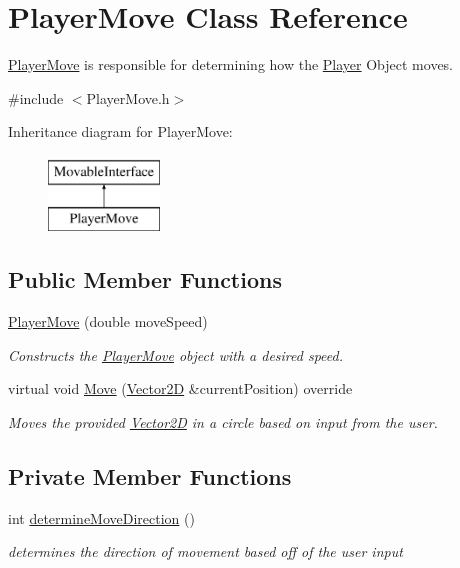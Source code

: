 \hypertarget{class_player_move}{}\section{Player\+Move Class Reference}
\label{class_player_move}


\hyperlink{class_player_move}{Player\+Move} is responsible for determining how the \hyperlink{class_player}{Player} Object moves.  




{\ttfamily \#include $<$Player\+Move.\+h$>$}

Inheritance diagram for Player\+Move\+:\begin{figure}[H]
\begin{center}
\leavevmode
\includegraphics[height=2.000000cm]{d8/d6d/class_player_move}
\end{center}
\end{figure}
\subsection*{Public Member Functions}
\begin{DoxyCompactItemize}
\item 
\hyperlink{class_player_move_afac691eb4cb3f0fbbf1876b5991e3a80}{Player\+Move} (double move\+Speed)
\begin{DoxyCompactList}\small\item\em Constructs the \hyperlink{class_player_move}{Player\+Move} object with a desired speed. \end{DoxyCompactList}\item 
virtual void \hyperlink{class_player_move_a1c39885d4126c63441250eae23ac718a}{Move} (\hyperlink{class_vector2_d}{Vector2D} \&current\+Position) override
\begin{DoxyCompactList}\small\item\em Moves the provided \hyperlink{class_vector2_d}{Vector2D} in a circle based on input from the user. \end{DoxyCompactList}\end{DoxyCompactItemize}
\subsection*{Private Member Functions}
\begin{DoxyCompactItemize}
\item 
int \hyperlink{class_player_move_a8118719df3dd369686b41a0ec77cd8e0}{determine\+Move\+Direction} ()
\begin{DoxyCompactList}\small\item\em determines the direction of movement based off of the user input \end{DoxyCompactList}\end{DoxyCompactItemize}
